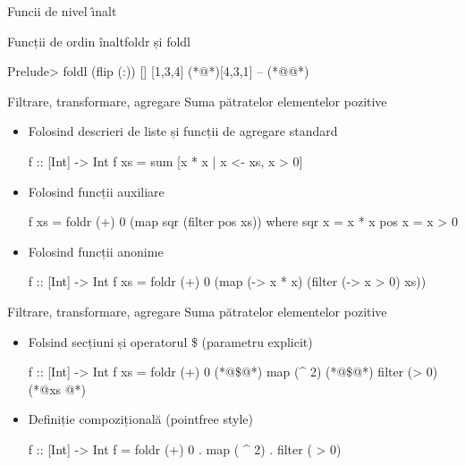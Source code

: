 \documentclass[xcolor=pdftex,romanian,colorlinks]{beamer}
\begin{document}
\begin{section}{Func\ts ii de nivel \^{\i}nalt}
\begin{frame}[fragile]{Funcții de ordin înalt}{foldr și foldl}
\begin{asciihs}
Prelude> foldl (flip (:)) [] [1,3,4]
(*@\pause@*)[4,3,1]  -- (*@\color{blue}{\it de ce? intelegeti modul de functionare!}@*)
\end{asciihs}
\end{frame}


\begin{frame}[fragile]{Filtrare, transformare, agregare}
  {Suma pătratelor elementelor pozitive}
\begin{itemize}
  \item Folosind descrieri de liste și funcții de agregare standard
\begin{asciihs}
f :: [Int] -> Int
f xs = sum [x * x | x <- xs, x > 0]
\end{asciihs}
\item Folosind funcții auxiliare
\begin{asciihs}
f xs = foldr (+) 0 (map sqr (filter pos xs))
  where
    sqr x = x * x
    pos x = x > 0
\end{asciihs}
\item Folosind funcții anonime
\begin{asciihs}
f :: [Int] -> Int
f xs = foldr (+) 0
    (map (\x -> x * x) (filter (\x -> x > 0) xs))
\end{asciihs}
\end{itemize}
\end{frame}

\begin{frame}[fragile]{Filtrare, transformare, agregare}
  {Suma pătratelor elementelor pozitive}
\begin{itemize}
  \item Folsind secțiuni și operatorul \$ (parametru explicit)
\begin{asciihs}
f :: [Int] -> Int
f xs = foldr (+) 0 (*@\color{blue}\$@*) map (^ 2)  (*@\color{blue}\$@*) filter (> 0) (*@\color{blue}xs @*)
\end{asciihs}

\bigskip

\item Definiție compozițională (pointfree style)
\begin{asciihs}
f :: [Int] -> Int
f = foldr (+) 0 . map ( ^ 2) . filter ( > 0)
\end{asciihs}
\end{itemize}


\end{frame}



\end{section}
\end{document}
